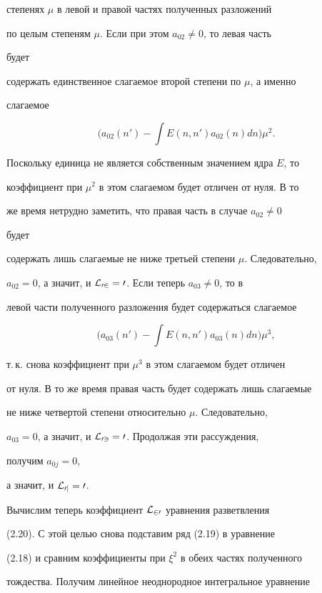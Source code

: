 степенях $\mu$ в левой и правой частях полученных разложений  


по целым степеням $\mu$. Если при этом $a_{02}\ne 0$, то левая часть 


будет  


содержать единственное слагаемое второй степени по $\mu$, а именно 


слагаемое 


$$ 


\Big(a_{02}(n')-\int E(n,n')a_{02}(n)dn\Big)\mu^2. 


$$ 


Поскольку единица не является собственным значением ядра $E$, то 


коэффициент при $\mu^2$ в этом слагаемом будет отличен от нуля. В то 


же время нетрудно заметить, что правая часть в случае $a_{02}\ne 0$ 


будет  


содержать лишь слагаемые не ниже третьей степени $\mu$. Следовательно, 


$a_{02}=0$, а значит, и $\cal L_{02}=0$. Если теперь $a_{03}\ne 0$, то в  


левой части полученного разложения будет содержаться слагаемое 


$$ 


\Big(a_{03}(n')-\int E(n,n')a_{03}(n)dn\Big)\mu^3, 


$$ 


т.\,к. снова коэффициент при $\mu^3$ в этом слагаемом будет отличен 


от нуля. В то же время правая часть будет содержать лишь слагаемые 


не ниже четвертой степени относительно $\mu$. Следовательно, 


$a_{03}=0$, а значит, и $\cal L_{03}=0$. Продолжая эти рассуждения, 


получим $a_{0j}=0$, 


а значит, и $\cal L_{0j}=0$. 


 


Вычислим теперь коэффициент $\cal L_{20}$ уравнения разветвления 


(2.20). С этой целью снова подставим ряд (2.19) в уравнение 


(2.18) и сравним коэффициенты при $\xi^2$ в обеих частях полученного 


тождества. Получим линейное неоднородное интегральное уравнение  


